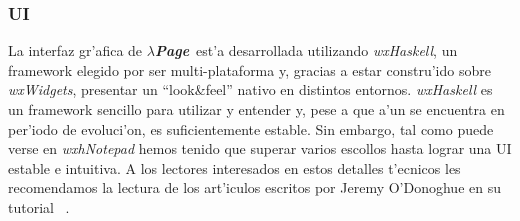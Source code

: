 \documentclass[a4paper]{article}
\newcommand{\hpage}{\textbf{\textsl{$\lambda$Page}}}
\begin{document}
\subsubsection{UI} La interfaz gr'afica de \hpage\ est'a desarrollada utilizando \textsl{wxHaskell}, un framework elegido por ser multi-plataforma y, gracias a estar constru'ido sobre \textsl{wxWidgets}, presentar un ``look\&feel'' nativo en distintos entornos.  \textsl{wxHaskell} es un framework sencillo para utilizar y entender y, pese a que a'un se encuentra en per'iodo de evoluci'on, es suficientemente estable.  Sin embargo, tal como puede verse en \textsl{wxhNotepad} hemos tenido que superar varios escollos hasta lograr una UI estable e intuitiva.  A los lectores interesados en estos detalles t'ecnicos les recomendamos la lectura de los art'iculos escritos por Jeremy O'Donoghue en su tutorial \ .
\end{document}
